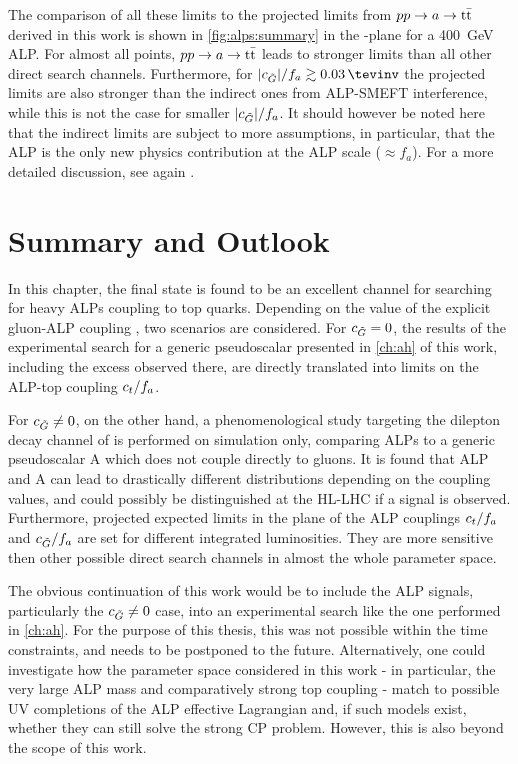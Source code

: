 The comparison of all these limits to the projected limits from $pp \rightarrow a \rightarrow \mathrm{t \bar{t}}$ derived in this work is shown in \cref{fig:alps:summary} in the \ct-\cG plane for a \SI{400}{\GeV} ALP. For almost all points, $pp \rightarrow a \rightarrow \mathrm{t \bar{t}}$ leads to stronger limits than all other direct search channels. Furthermore, for $|\cG|/f_a \gtrsim \SI{0.03}{\tevinv}$ the projected limits are also stronger than the indirect ones from ALP-SMEFT interference, while this is not the case for smaller $|c_{\tilde{G}}|/f_a$. It should however be noted here that the indirect limits are subject to more assumptions, in particular, that the ALP is the only new physics contribution at the ALP scale ($\approx f_a$). For a more detailed discussion, see again .

\section{Summary and Outlook}
\label{sec:alps:summary}

In this chapter, the \ttbar final state is found to be an excellent channel for searching for heavy ALPs coupling to top quarks. Depending on the value of the explicit gluon-ALP coupling \cG, two scenarios are considered. For $c_{\tilde{G}} = 0$, the results of the experimental search for a generic pseudoscalar presented in \cref{ch:ah} of this work, including the excess observed there,  are directly translated into limits on the ALP-top coupling $c_t/f_a$. 

For $c_{\tilde{G}} \neq 0$, on the other hand, a phenomenological study targeting the dilepton decay channel of \ttbar is performed on simulation only, comparing ALPs to a generic pseudoscalar A which does not couple directly to gluons. It is found that ALP and A can lead to drastically different \mtt distributions depending on the coupling values, and could possibly be distinguished at the HL-LHC if a signal is observed. Furthermore, projected expected limits in the plane of the ALP couplings $c_t/f_a$ and $c_{\tilde{G}}/f_a$ are set for different integrated luminosities. They are more sensitive then other possible direct search channels in almost the whole parameter space.

The obvious continuation of this work would be to include the ALP signals, particularly the $c_{\tilde{G}} \neq 0$ case, into an experimental search like the one performed in \cref{ch:ah}. For the purpose of this thesis, this was not possible within the time constraints, and needs to be postponed to the future. Alternatively, one could investigate how the parameter space considered in this work - in particular, the very large ALP mass and comparatively strong top coupling - match to possible UV completions of the ALP effective Lagrangian and, if such models exist, whether they can still solve the strong CP problem. However, this is also beyond the scope of this work.